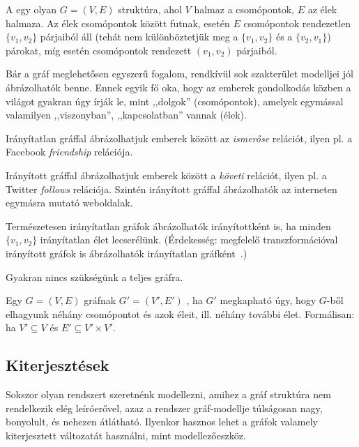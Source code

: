 \begin{definicio}
A  egy olyan $G = (V, E)$ struktúra, ahol $V$ halmaz a csomópontok, $E$ az élek halmaza. Az élek csomópontok között futnak,  esetén $E$ csomópontok rendezetlen $\{v_1, v_2\}$ párjaiból áll (tehát nem különböztetjük meg a $\{v_1, v_2\}$ és a $\{v_2, v_1\}$) párokat, míg  esetén csomópontok rendezett $(v_1, v_2)$ párjaiból.
\end{definicio}

Bár a gráf meglehetősen egyszerű fogalom, rendkívül sok szakterület modelljei jól ábrázolhatók benne. Ennek egyik fő oka, hogy az emberek gondolkodás közben a világot gyakran úgy írják le, mint ,,dolgok'' (csomópontok), amelyek egymással valamilyen ,,viszonyban'', ,,kapcsolatban'' vannak (élek).

\begin{pelda}
Irányítatlan gráffal ábrázolhatjuk emberek között az \emph{ismerőse} relációt, ilyen pl. a Facebook \emph{friendship} relációja.
\end{pelda}

\begin{pelda}
Irányított gráffal ábrázolhatjuk emberek között a \emph{követi} relációt, ilyen pl. a Twitter \emph{follows} relációja. Szintén irányított gráffal ábrázolhatók az interneten egymásra mutató weboldalak.
\end{pelda}

Természetesen irányítatlan gráfok ábrázolhatók irányítottként is, ha minden $\{v_1, v_2\}$ irányítatlan élet lecserélünk. (Érdekesség: megfelelő transzformációval irányított gráfok is ábrázolhatók irányítatlan gráfként~\cite{rodriguez2008mapping}.)

Gyakran nincs szükségünk a teljes gráfra.

\begin{definicio}
Egy $G = (V, E)$ gráfnak $G' = (V', E')$ , ha $G'$ megkapható úgy, hogy $G$-ből elhagyunk néhány csomópontot és azok éleit, ill. néhány további élet. Formálisan: ha $V' \subseteq V$ és $E' \subseteq V' \times V'$.
\end{definicio}	

\subsection{Kiterjesztések}

Sokszor olyan rendszert szeretnénk modellezni, amihez a gráf struktúra nem rendelkezik elég leíróerővel, azaz a rendszer gráf-modellje túlságosan nagy, bonyolult, és nehezen átlátható. Ilyenkor hasznos lehet a gráfok valamely kiterjesztett változatát használni, mint modellezőeszköz.

